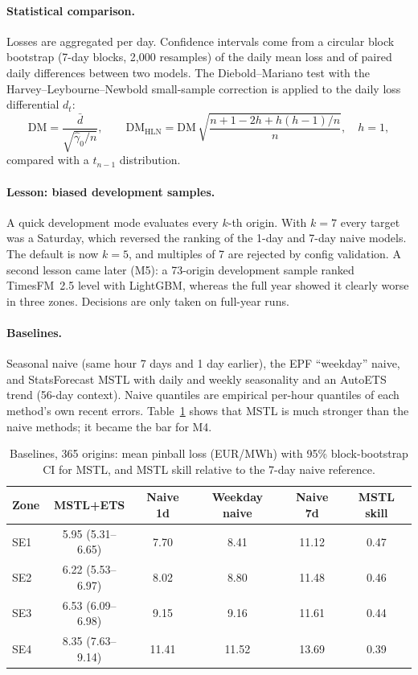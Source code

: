 \documentclass[11pt,a4paper]{article}
\begin{document}
\paragraph{Statistical comparison.}
Losses are aggregated per day. Confidence intervals come from a circular block bootstrap
(7-day blocks, 2{,}000 resamples) of the daily mean loss and of paired daily differences between
two models. The Diebold--Mariano test with the Harvey--Leybourne--Newbold small-sample correction
is applied to the daily loss differential $d_t$:
\begin{equation}
\mathrm{DM} = \frac{\bar d}{\sqrt{\hat\gamma_0 / n}}, \qquad
\mathrm{DM}_{\mathrm{HLN}} = \mathrm{DM}\,\sqrt{\frac{n+1-2h+h(h-1)/n}{n}}, \quad h=1,
\end{equation}
compared with a $t_{n-1}$ distribution.

\paragraph{Lesson: biased development samples.}
A quick development mode evaluates every $k$-th origin. With $k=7$ every target was a Saturday,
which reversed the ranking of the 1-day and 7-day naive models. The default is now $k=5$, and
multiples of 7 are rejected by config validation. A second lesson came later (M5): a 73-origin
development sample ranked TimesFM~2.5 level with LightGBM, whereas the full year showed it clearly
worse in three zones. Decisions are only taken on full-year runs.

\paragraph{Baselines.}
Seasonal naive (same hour 7 days and 1 day earlier), the EPF ``weekday'' naive, and
StatsForecast MSTL with daily and weekly seasonality and an AutoETS trend (56-day context).
Naive quantiles are empirical per-hour quantiles of each method's own recent errors.
Table~\ref{tab:baselines} shows that MSTL is much stronger than the naive methods; it became the
bar for M4.

\begin{table}[h]
\centering\small
\caption{Baselines, 365 origins: mean pinball loss (EUR/MWh) with 95\% block-bootstrap CI for
MSTL, and MSTL skill relative to the 7-day naive reference.}
\label{tab:baselines}
\begin{tabular}{lccccc}
\toprule
Zone & MSTL+ETS & Naive 1d & Weekday naive & Naive 7d & MSTL skill\\
\midrule
SE1 & 5.95 (5.31--6.65) & 7.70 & 8.41 & 11.12 & 0.47\\
SE2 & 6.22 (5.53--6.97) & 8.02 & 8.80 & 11.48 & 0.46\\
SE3 & 6.53 (6.09--6.98) & 9.15 & 9.16 & 11.61 & 0.44\\
SE4 & 8.35 (7.63--9.14) & 11.41 & 11.52 & 13.69 & 0.39\\
\bottomrule
\end{tabular}
\end{table}
\end{document}
